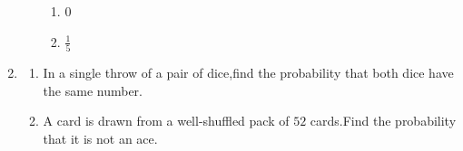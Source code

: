 \begin{enumerate}[label=\thesection.\arabic*.,ref=\thesection.\theenumi]
\begin{enumerate}[label=(\roman*)]
\begin{enumerate}[label=(\Alph*)]
        \item $0$ 
        \item $\frac{1}{5}$               
\end{enumerate}
\end{enumerate}
\item \begin{enumerate}[label=(\alph*)]
\item In a single throw of a pair of dice,find the probability that both dice have the same number.
\item A card is drawn from a well-shuffled pack of $52$ cards.Find the probability that it is not an ace.
\end{enumerate}
\end{enumerate}
